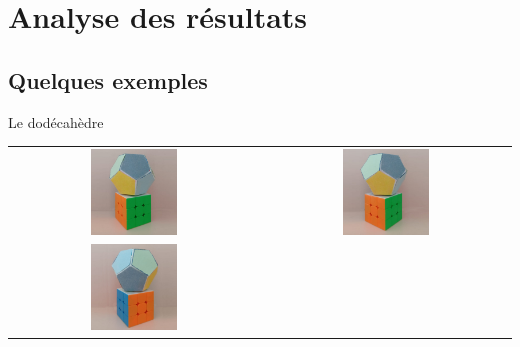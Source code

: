\section[Analyse des résultats]{Analyse des résultats}

\subsection{Quelques exemples}

\begin{frame}{Le dodécahèdre}
\begin{minipage}{0.40\textwidth}
    \centering
    \setlength{\tabcolsep}{0pt}
    \renewcommand{\arraystretch}{0}
    \begin{tabular}{cc}
        \includegraphics[width=0.36\textwidth]{capture/dodecf0.jpg} &
        \includegraphics[width=0.36\textwidth]{capture/dodecf1.jpg} \\
        \includegraphics[width=0.36\textwidth]{capture/dodecf2.jpg} &

\end{tabular}
\end{minipage}
\end{frame}
